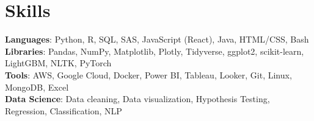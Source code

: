 \section{Skills}
 \begin{itemize}[leftmargin=0.15in, label={}]
    \small{\item{
     \textbf{Languages}{: Python, R, SQL, SAS, JavaScript (React), Java, HTML/CSS, Bash} \\
     \textbf{Libraries}{: Pandas, NumPy, Matplotlib, Plotly, Tidyverse, ggplot2, scikit-learn, LightGBM, NLTK, PyTorch}\\
     \textbf{Tools}{: AWS, Google Cloud, Docker, Power BI, Tableau, Looker, Git, Linux, MongoDB, Excel}\\
     \textbf{Data Science}{: Data cleaning, Data visualization, Hypothesis Testing, Regression, Classification, NLP}\\
    }}
 \end{itemize}
